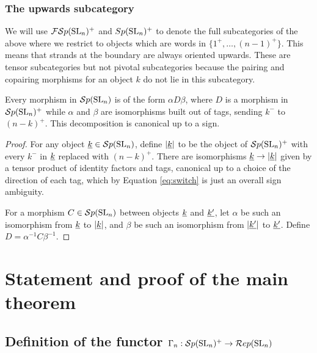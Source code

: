 \documentclass[10pt,leqno]{article}
\begin{document}

\subsubsection{The upwards subcategory}
We will use ${\mathcal{FS}p}({\rm{SL}}_n)^+$ and $Sp({\rm{SL}}_n)^+$ to denote the full subcategories of the above where we restrict to objects which are words in $\{1^+,\ldots,(n-1)^+\}$. This means that strands at the boundary are always oriented upwards. These are tensor subcategories but not pivotal subcategories because the pairing and copairing morphisms for an object $k$ do not lie in this subcategory.

\begin{lem}
Every morphism in ${\mathcal{S}p}({\rm{SL}}_n)$ is of the form $\alpha D \beta$, where $D$ is a morphism in ${\mathcal{S}p}({\rm{SL}}_n)^+$ while $\alpha$ and $\beta$ are isomorphisms built out of tags, sending $k^-$ to $(n-k)^+$.  This decomposition is canonical up to a sign.
\end{lem}
\begin{proof}
For any object ${\underline{k}} \in {\mathcal{S}p}({\rm{SL}}_n)$, define $\left|{\underline{k}}\right|$ to be the object of ${\mathcal{S}p}({\rm{SL}}_n)^+$ with every $k^-$ in ${\underline{k}}$ replaced with $(n-k)^+$. There are isomorphisms ${\underline{k}} \to \left|{\underline{k}}\right|$ given by a tensor product of identity factors and tags, canonical up to a choice of the direction of each tag, which by Equation \eqref{eq:switch} is just an overall sign ambiguity.

For a morphism $C \in {\mathcal{S}p}({\rm{SL}}_n)$ between objects ${\underline{k}}$ and ${\underline{k'}}$, let $\alpha$ be such an isomorphism from ${\underline{k}}$ to $\left|{\underline{k}}\right|$, and $\beta$ be such an isomorphism from $\left|{\underline{k'}}\right|$ to ${\underline{k'}}$. Define $D = \alpha^{-1} C \beta^{-1}$.
\end{proof}


\section{Statement and proof of the main theorem}\label{sec:theorem}

\subsection{Definition of the functor $\Gamma_n: {\mathcal{S}p}({\rm{SL}}_n)^+ \rightarrow \mathcal{R}ep({\rm{SL}}_n)$}
\end{document}
